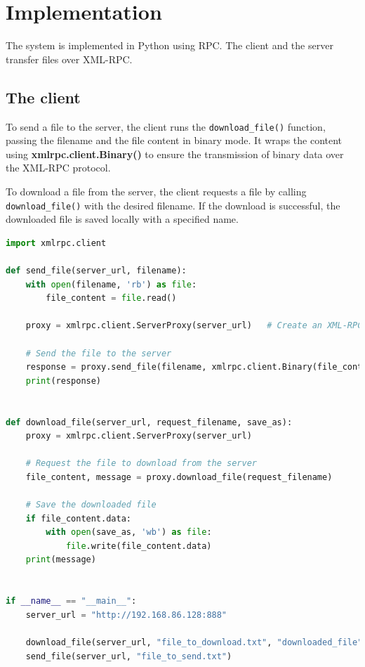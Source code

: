 \documentclass[12pt]{article}
\begin{document}
\section{Implementation}
The system is implemented in Python using RPC. The client and the server transfer files over XML-RPC.

\subsection{The client}

To send a file to the server, the client runs the \verb|download_file()| function, passing the filename and the file content in binary mode. It wraps the content using \textbf{xmlrpc.client.Binary()} to ensure the transmission of binary data over the XML-RPC protocol.

To download a file from the server, the client requests a file by calling \verb|download_file()| with the desired filename. If the download is successful, the downloaded file is saved locally with a specified name.
\newpage

\begin{lstlisting}[language=Python]
import xmlrpc.client

def send_file(server_url, filename):
    with open(filename, 'rb') as file:
        file_content = file.read()

    proxy = xmlrpc.client.ServerProxy(server_url)   # Create an XML-RPC server proxy

    # Send the file to the server
    response = proxy.send_file(filename, xmlrpc.client.Binary(file_content))
    print(response)


def download_file(server_url, request_filename, save_as):
    proxy = xmlrpc.client.ServerProxy(server_url)

    # Request the file to download from the server
    file_content, message = proxy.download_file(request_filename)
    
    # Save the downloaded file
    if file_content.data:
        with open(save_as, 'wb') as file:
            file.write(file_content.data)
    print(message)


if __name__ == "__main__":
    server_url = "http://192.168.86.128:888"

    download_file(server_url, "file_to_download.txt", "downloaded_file")
    send_file(server_url, "file_to_send.txt")

\end{lstlisting}
\end{document}
